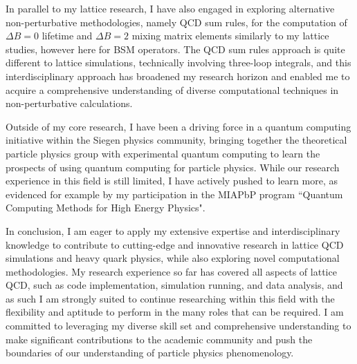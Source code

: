 \documentclass[11pt, a4paper]{awesome-cv}
\begin{document}
\begin{cvletter}
In parallel to my lattice research, I have also engaged in exploring alternative non-perturbative methodologies, namely QCD sum rules, for the computation of $\Delta B=0$ lifetime and $\Delta B=2$ mixing matrix elements similarly to my lattice studies, however here for BSM operators.
The QCD sum rules approach is quite different to lattice simulations, technically involving three-loop integrals, and this interdisciplinary approach has broadened my research horizon and enabled me to acquire a comprehensive understanding of diverse computational techniques in non-perturbative calculations.

Outside of my core research, I have been a driving force in a quantum computing initiative within the Siegen physics community, bringing together the theoretical particle physics group with experimental quantum computing to learn the prospects of using quantum computing for particle physics. 
While our research experience in this field is still limited, I have actively pushed to learn more, as evidenced for example by my participation in the MIAPbP program ``Quantum Computing Methods for High Energy Physics".


In conclusion, I am eager to apply my extensive expertise and interdisciplinary knowledge to contribute to cutting-edge and innovative research in lattice QCD simulations and heavy quark physics, while also exploring novel computational methodologies. 
My research experience so far has covered all aspects of lattice QCD, such as code implementation, simulation running, and data analysis, and as such I am strongly suited to continue researching within this field with the flexibility and aptitude to perform in the many roles that can be required.
I am committed to leveraging my diverse skill set and comprehensive understanding to make significant contributions to the academic community and push the boundaries of our understanding of particle physics phenomenology.

\end{cvletter}

\makeletterclosing
\end{document}
